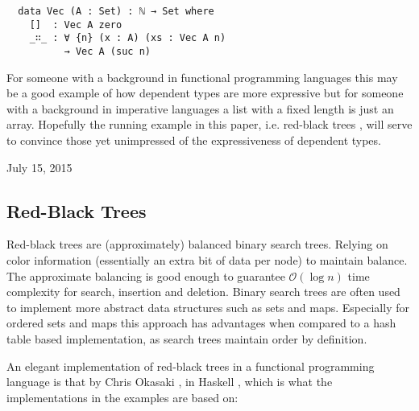 \documentclass[journal, retainorgcmds]{IEEEtran}
\begin{document}
\begin{verbatim}
  data Vec (A : Set) : ℕ → Set where
    []  : Vec A zero
    _∷_ : ∀ {n} (x : A) (xs : Vec A n)
          → Vec A (suc n)
\end{verbatim}

For someone with a background in functional programming languages this may be
a good example of how dependent types are more expressive but for someone with
a background in imperative languages a list with a fixed length is just an
array.
Hopefully the running example in this paper, i.e. red-black trees
\cite{rbtrees}, will serve to convince those yet unimpressed of the
expressiveness of dependent types.

\hfill July 15, 2015

\subsection{Red-Black Trees}

Red-black trees are (approximately) balanced binary search trees.
Relying on color information (essentially an extra bit of data per node) to
maintain balance.
The approximate balancing is good enough to guarantee $\mathcal{O}(\log{}n)$
time complexity for search, insertion and deletion.
Binary search trees are often used to implement more abstract data structures
such as sets and maps.
Especially for ordered sets and maps this approach has advantages when compared
to a hash table based implementation, as search trees maintain order by
definition.

An elegant implementation of red-black trees in a functional programming
language is that by Chris Okasaki \cite{okasaki}, in Haskell \cite{haskell},
which is what the implementations in the examples are based on:
\end{document}
